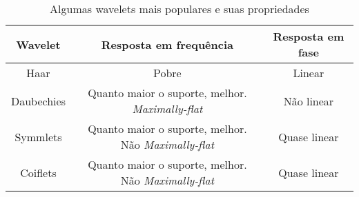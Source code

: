 \begin{table}[h]
	\centering
	\begin{tabular}{|c|c|c|}
			\hline 
			\textbf{Wavelet} & \textbf{Resposta em frequência} & \textbf{Resposta em fase} \\ 
			\hline 
			Haar & Pobre &  Linear \\ 
			\hline 
			Daubechies & Quanto maior o suporte, melhor. \textit{Maximally-flat}  &  Não linear \\ 
			\hline 
			Symmlets & Quanto maior o suporte, melhor. Não \textit{Maximally-flat} & Quase linear \\ 
			\hline 
			Coiflets & Quanto maior o suporte, melhor. Não \textit{Maximally-flat} & Quase linear \\ 
			\hline 
	\end{tabular} 
	\caption{Algumas wavelets mais populares e suas propriedades}
	\label{tab:waveletsProperties}
\end{table}